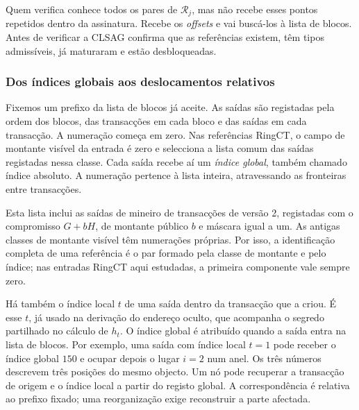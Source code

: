 Quem verifica conhece todos os pares de \(\mathcal R_j\), mas não recebe
esses pontos repetidos dentro da assinatura. Recebe os \emph{offsets} e vai
buscá-los à lista de blocos. Antes de verificar a CLSAG confirma que as referências
existem, têm tipos admissíveis, já maturaram e estão desbloqueadas.

\subsubsection{Dos índices globais aos deslocamentos relativos}
\label{subsec:global-output-indices}

Fixemos um prefixo da lista de blocos já aceite. As saídas são registadas
pela ordem dos blocos, das transacções em cada bloco e das saídas em cada
transacção. A numeração começa em zero. Nas referências RingCT, o campo
de montante visível da entrada é zero e selecciona a lista comum das
saídas registadas nessa classe. Cada saída recebe aí um \emph{índice
global}, também chamado índice absoluto. A numeração pertence à lista
inteira, atravessando as fronteiras entre transacções.

Esta lista inclui as saídas de mineiro de transacções de versão 2,
registadas com o compromisso \(G+bH\), de montante público \(b\) e
máscara igual a um. As antigas classes de montante visível
têm numerações próprias. Por isso, a identificação completa de uma
referência é o par formado pela classe de montante e pelo índice; nas
entradas RingCT aqui estudadas, a primeira componente vale sempre zero.

Há também o índice local \(t\) de uma saída dentro da transacção que a
criou. É esse \(t\), já usado na derivação do endereço oculto, que
acompanha o segredo partilhado no cálculo de \(h_t\). O índice global
é atribuído quando a saída entra na lista de blocos. Por exemplo, uma
saída com índice local \(t=1\) pode receber o índice global \(150\) e
ocupar depois o lugar \(i=2\) num anel. Os três números descrevem três
posições do mesmo objecto. Um nó pode recuperar a transacção de origem e
o índice local a partir do registo global. A correspondência é relativa
ao prefixo fixado; uma reorganização exige reconstruir a parte afectada.

